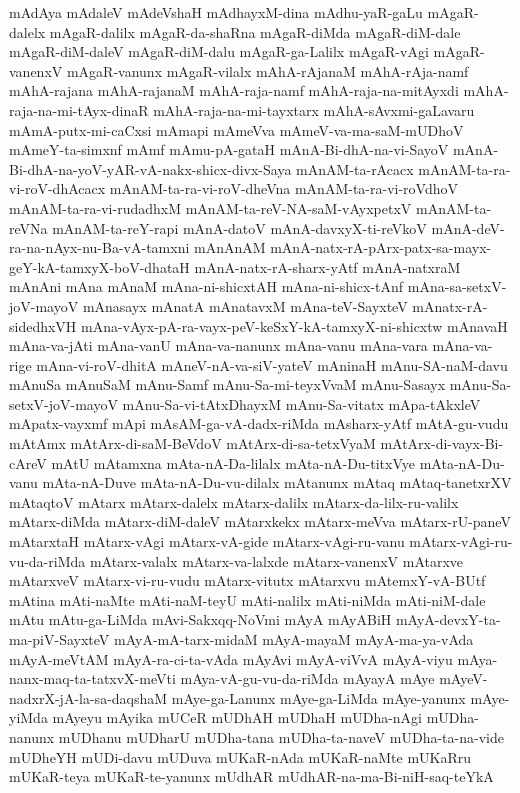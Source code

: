 {mAdAya
mAdaleV
mAdeVshaH
mAdhayxM-dina
mAdhu-yaR-gaLu
mAgaR-dalelx
mAgaR-dalilx
mAgaR-da-shaRna
mAgaR-diMda
mAgaR-diM-dale
mAgaR-diM-daleV
mAgaR-diM-dalu
mAgaR-ga-Lalilx
mAgaR-vAgi
mAgaR-vanenxV
mAgaR-vanunx
mAgaR-vilalx
mAhA-rAjanaM
mAhA-rAja-namf
mAhA-rajana
mAhA-rajanaM
mAhA-raja-namf
mAhA-raja-na-mitAyxdi
mAhA-raja-na-mi-tAyx-dinaR
mAhA-raja-na-mi-tayxtarx
mAhA-sAvxmi-gaLavaru
mAmA-putx-mi-caCxsi
mAmapi
mAmeVva
mAmeV-va-ma-saM-mUDhoV
mAmeY-ta-simxnf
mAmf
mAmu-pA-gataH
mAnA-Bi-dhA-na-vi-SayoV
mAnA-Bi-dhA-na-yoV-yAR-vA-nakx-shicx-divx-Saya
mAnAM-ta-rAcacx
mAnAM-ta-ra-vi-roV-dhAcacx
mAnAM-ta-ra-vi-roV-dheVna
mAnAM-ta-ra-vi-roVdhoV
mAnAM-ta-ra-vi-rudadhxM
mAnAM-ta-reV-NA-saM-vAyxpetxV
mAnAM-ta-reVNa
mAnAM-ta-reY-rapi
mAnA-datoV
mAnA-davxyX-ti-reVkoV
mAnA-deV-ra-na-nAyx-nu-Ba-vA-tamxni
mAnAnAM
mAnA-natx-rA-pArx-patx-sa-mayx-geY-kA-tamxyX-boV-dhataH
mAnA-natx-rA-sharx-yAtf
mAnA-natxraM
mAnAni
mAna
mAnaM
mAna-ni-shicxtAH
mAna-ni-shicx-tAnf
mAna-sa-setxV-joV-mayoV
mAnasayx
mAnatA
mAnatavxM
mAna-teV-SayxteV
mAnatx-rA-sidedhxVH
mAna-vAyx-pA-ra-vayx-peV-keSxY-kA-tamxyX-ni-shicxtw
mAnavaH
mAna-va-jAti
mAna-vanU
mAna-va-nanunx
mAna-vanu
mAna-vara
mAna-va-rige
mAna-vi-roV-dhitA
mAneV-nA-va-siV-yateV
mAninaH
mAnu-SA-naM-davu
mAnuSa
mAnuSaM
mAnu-Samf
mAnu-Sa-mi-teyxVvaM
mAnu-Sasayx
mAnu-Sa-setxV-joV-mayoV
mAnu-Sa-vi-tAtxDhayxM
mAnu-Sa-vitatx
mApa-tAkxleV
mApatx-vayxmf
mApi
mAsAM-ga-vA-dadx-riMda
mAsharx-yAtf
mAtA-gu-vudu
mAtAmx
mAtArx-di-saM-BeVdoV
mAtArx-di-sa-tetxVyaM
mAtArx-di-vayx-Bi-cAreV
mAtU
mAtamxna
mAta-nA-Da-lilalx
mAta-nA-Du-titxVye
mAta-nA-Du-vanu
mAta-nA-Duve
mAta-nA-Du-vu-dilalx
mAtanunx
mAtaq
mAtaq-tanetxrXV
mAtaqtoV
mAtarx
mAtarx-dalelx
mAtarx-dalilx
mAtarx-da-lilx-ru-valilx
mAtarx-diMda
mAtarx-diM-daleV
mAtarxkekx
mAtarx-meVva
mAtarx-rU-paneV
mAtarxtaH
mAtarx-vAgi
mAtarx-vA-gide
mAtarx-vAgi-ru-vanu
mAtarx-vAgi-ru-vu-da-riMda
mAtarx-valalx
mAtarx-va-lalxde
mAtarx-vanenxV
mAtarxve
mAtarxveV
mAtarx-vi-ru-vudu
mAtarx-vitutx
mAtarxvu
mAtemxY-vA-BUtf
mAtina
mAti-naMte
mAti-naM-teyU
mAti-nalilx
mAti-niMda
mAti-niM-dale
mAtu
mAtu-ga-LiMda
mAvi-Sakxqq-NoVmi
mAyA
mAyABiH
mAyA-devxY-ta-ma-piV-SayxteV
mAyA-mA-tarx-midaM
mAyA-mayaM
mAyA-ma-ya-vAda
mAyA-meVtAM
mAyA-ra-ci-ta-vAda
mAyAvi
mAyA-viVvA
mAyA-viyu
mAya-nanx-maq-ta-tatxvX-meVti
mAya-vA-gu-vu-da-riMda
mAyayA
mAye
mAyeV-nadxrX-jA-la-sa-daqshaM
mAye-ga-Lanunx
mAye-ga-LiMda
mAye-yanunx
mAye-yiMda
mAyeyu
mAyika
mUCeR
mUDhAH
mUDhaH
mUDha-nAgi
mUDha-nanunx
mUDhanu
mUDharU
mUDha-tana
mUDha-ta-naveV
mUDha-ta-na-vide
mUDheYH
mUDi-davu
mUDuva
mUKaR-nAda
mUKaR-naMte
mUKaRru
mUKaR-teya
mUKaR-te-yanunx
mUdhAR
mUdhAR-na-ma-Bi-niH-saq-teYkA
}
